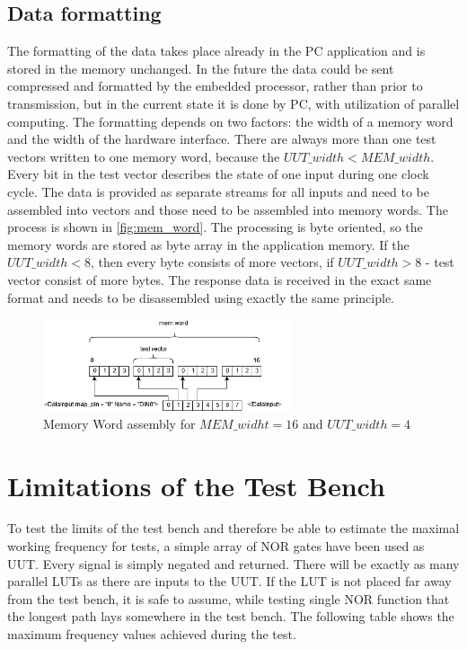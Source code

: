\subsection{Data formatting}
The formatting of the data takes place already in the PC application and is stored in the memory unchanged. In the future the data could be sent compressed and formatted by the embedded processor, rather than prior to transmission, but in the current state it is done by PC, with utilization of parallel computing. The formatting depends on two factors: the width of a memory word and the width of the hardware interface. There are always more than one test vectors written to one memory word, because the $UUT\_width < MEM\_width$. Every bit in the test vector describes the state of one input during one clock cycle. The data is provided as separate streams for all inputs and need to be assembled into vectors and those need to be assembled into memory words. The process is shown in \autoref{fig:mem_word}. The processing is byte oriented, so the memory words are stored as byte array in the application memory. If the $UUT\_width<8$, then every byte consists of more vectors, if $UUT\_width>8$ - test vector consist of more bytes. The response data is received in the exact same format and needs to be disassembled using exactly the same principle.

\begin{figure}[h]
\centering
\includegraphics[width=0.65\textwidth]{figures/mem_word.png}
\caption{Memory Word assembly for $MEM\_widht = 16$ and $UUT\_width = 4$}
\label{fig:mem_word}
\end{figure}

\section{Limitations of the Test Bench}
To test the limits of the test bench and therefore be able to estimate the maximal working frequency for tests, a simple array of NOR gates have been used as UUT. Every signal is simply negated and returned. There will be exactly as many parallel LUTs as there are inputs to the UUT. If the LUT is not placed far away from the test bench, it is safe to assume, while testing single NOR function that the longest path lays somewhere in the test bench. The following table shows the maximum frequency values achieved during the test.

